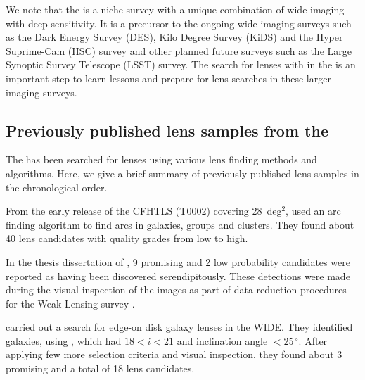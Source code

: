 \documentclass[useAMS,usenatbib,a4paper]{mn2e}
\begin{document}
We note that the \cfhtls is a niche survey with a unique combination of wide
imaging with deep sensitivity. It is a precursor to the ongoing wide imaging
surveys such as the Dark Energy Survey (DES), Kilo Degree Survey (KiDS) and the
Hyper Suprime-Cam (HSC) survey and other planned future surveys such as the
Large Synoptic Survey Telescope (LSST) survey.  The search for lenses with \sw
in the \cfhtls is an important step to learn lessons and prepare for lens
searches in these larger imaging surveys.



\subsection{Previously published lens samples from the \cfhtls}
\label{sec:data:kls}

The \cfhtls has been searched for lenses using various lens finding
methods and algorithms. Here, we give a brief summary of previously published lens
samples in the chronological order.

From the early release of the CFHTLS (T0002) covering 28~deg$^2$,
\citet{Cabanac2007} used an arc finding algorithm \citep{Alard2006} to
find arcs in galaxies, groups and clusters. They found about 40 lens
candidates with quality grades from low to high.

In the thesis dissertation of \citet{Thanjavur2009}, 9 promising and 2
low probability candidates were reported as having been discovered
serendipitously. These detections were made during the visual
inspection of the \cfhtls images as part of data reduction procedures
for the Weak Lensing survey \citep{Benjamin2007}.

\citet{Sygnet2010} carried out a search for edge-on disk galaxy lenses in the
\cfhtls WIDE. They identified galaxies, using \sextractor, which
had $18<i<21$ and inclination angle $<25\,^{\circ}$. After applying few more
selection criteria and visual inspection, they found about 3 promising
and a total of 18 lens candidates.
\end{document}
